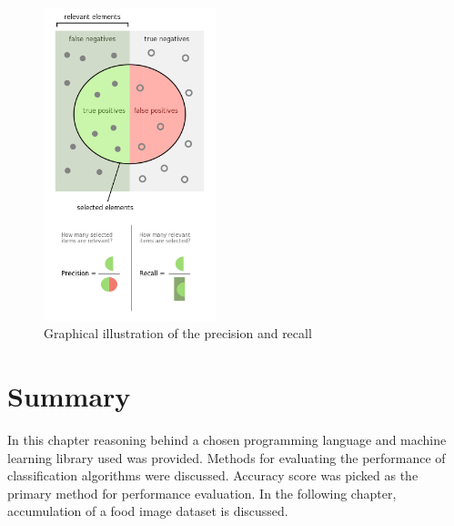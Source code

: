 \begin{figure}[ht]
\centering
\includegraphics[width=5cm]{Figures/c3/p.png}
\caption{Graphical illustration of the precision and recall \cite{wiki:p}}
\label{fig:p}
\end{figure}


\section{Summary}
In this chapter reasoning behind a chosen programming language and machine learning library used was provided. Methods for evaluating the performance of classification algorithms were discussed. Accuracy score was picked as the primary method for performance evaluation. In the following chapter, accumulation of a food image dataset is discussed.